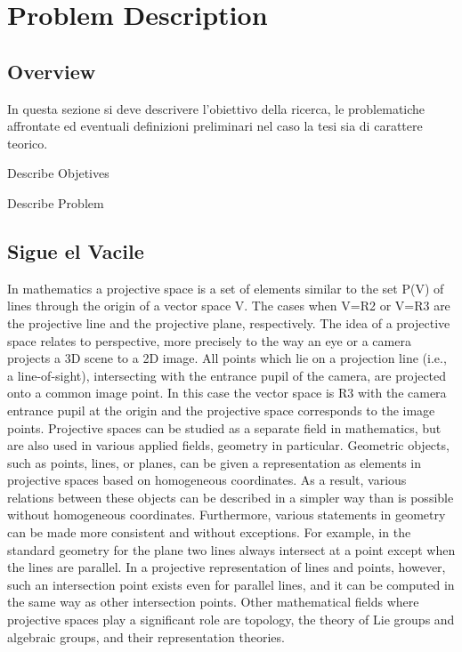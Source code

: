 
\chapter{Problem Description}


\section{Overview}

In questa sezione si deve descrivere l'obiettivo della ricerca, le
problematiche affrontate ed eventuali definizioni preliminari nel
caso la tesi sia di carattere teorico.

\textbullet{} Describe Objetives

\textbullet{} Describe Problem


\section{Sigue el Vacile}

In mathematics a projective space is a set of elements similar to
the set P(V) of lines through the origin of a vector space V. The
cases when V=R2 or V=R3 are the projective line and the projective
plane, respectively. The idea of a projective space relates to perspective,
more precisely to the way an eye or a camera projects a 3D scene to
a 2D image. All points which lie on a projection line (i.e., a \textquotedbl{}line-of-sight\textquotedbl{}),
intersecting with the entrance pupil of the camera, are projected
onto a common image point. In this case the vector space is R3 with
the camera entrance pupil at the origin and the projective space corresponds
to the image points. Projective spaces can be studied as a separate
field in mathematics, but are also used in various applied fields,
geometry in particular. Geometric objects, such as points, lines,
or planes, can be given a representation as elements in projective
spaces based on homogeneous coordinates. As a result, various relations
between these objects can be described in a simpler way than is possible
without homogeneous coordinates. Furthermore, various statements in
geometry can be made more consistent and without exceptions. For example,
in the standard geometry for the plane two lines always intersect
at a point except when the lines are parallel. In a projective representation
of lines and points, however, such an intersection point exists even
for parallel lines, and it can be computed in the same way as other
intersection points. Other mathematical fields where projective spaces
play a significant role are topology, the theory of Lie groups and
algebraic groups, and their representation theories.



